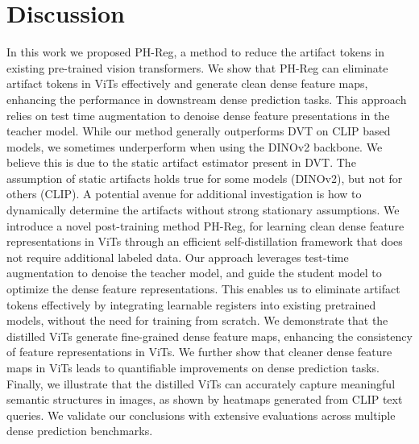 \vspace{-.2cm}
\section{Discussion}
 In this work we proposed PH-Reg, a method to reduce the artifact tokens in existing pre-trained vision transformers. We show that PH-Reg can eliminate artifact tokens in ViTs effectively and generate clean dense feature maps, enhancing the performance in downstream dense prediction tasks. This approach relies on test time augmentation to denoise dense feature presentations in the teacher model. While our method generally outperforms DVT on CLIP based models, we sometimes underperform when using the DINOv2 backbone. We believe this is due to the static artifact estimator present in DVT. The assumption of static artifacts holds true for some models (DINOv2), but not for others (CLIP). A potential avenue for additional investigation is how to dynamically determine the artifacts without strong stationary assumptions. 
We introduce a novel post-training method PH-Reg, for learning clean dense feature representations in ViTs through an efficient self-distillation framework that does not require additional labeled data. Our approach leverages test-time augmentation to denoise the teacher model, and guide the student model to optimize the dense feature representations.
This enables us to eliminate artifact tokens effectively by integrating learnable registers into existing pretrained models, without the need for training from scratch.
We demonstrate that the distilled ViTs generate fine-grained dense feature maps, enhancing the consistency of feature representations in ViTs. 
We further show that cleaner dense feature maps in ViTs leads to quantifiable improvements on dense prediction tasks. 
Finally, we illustrate that the distilled ViTs can accurately capture meaningful semantic structures in images, as shown by heatmaps generated from CLIP text queries.
We validate our conclusions with extensive evaluations across multiple dense prediction benchmarks.

